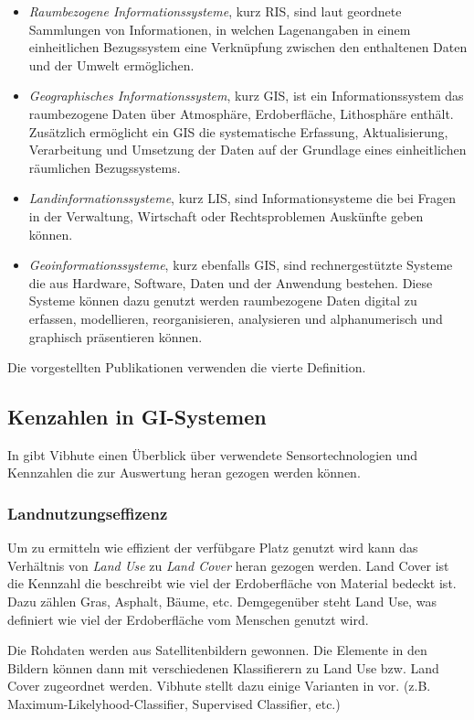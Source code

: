 \begin{itemize}
	\item \textit{Raumbezogene Informationssysteme}, kurz RIS, sind laut \cite{book:Cariosio2006} geordnete Sammlungen von Informationen, in welchen Lagenangaben in einem einheitlichen Bezugssystem eine Verknüpfung zwischen den enthaltenen Daten und der Umwelt ermöglichen.
	\item \textit{Geographisches Informationssystem}, kurz GIS, ist ein Informationssystem das raumbezogene Daten über Atmosphäre, Erdoberfläche, Lithosphäre enthält. Zusätzlich ermöglicht ein GIS die systematische Erfassung, Aktualisierung, Verarbeitung und Umsetzung der Daten auf der Grundlage eines einheitlichen räumlichen Bezugssystems.
	\item \textit{Landinformationssysteme}, kurz LIS, sind Informationsysteme die bei Fragen in der Verwaltung, Wirtschaft oder Rechtsproblemen Auskünfte geben können. 
	\item \textit{Geoinformationssysteme}, kurz ebenfalls GIS, sind rechnergestützte Systeme die aus Hardware, Software, Daten und der Anwendung bestehen. Diese Systeme können dazu genutzt werden raumbezogene Daten digital zu erfassen, modellieren, reorganisieren, analysieren und alphanumerisch und graphisch präsentieren können.
\end{itemize}

Die vorgestellten Publikationen verwenden die vierte Definition.

\subsection{Kenzahlen in GI-Systemen}
In \cite{jour:Vibhute2013} gibt Vibhute einen Überblick über verwendete Sensortechnologien und Kennzahlen die zur Auswertung heran gezogen werden können.  

\subsubsection{Landnutzungseffizenz}

Um zu ermitteln wie effizient der verfübgare Platz genutzt wird kann das Verhältnis von \textit{Land Use} zu \textit{Land Cover} heran gezogen werden. Land Cover ist die Kennzahl die beschreibt wie viel der Erdoberfläche von Material bedeckt ist. Dazu zählen Gras, Asphalt, Bäume, etc. Demgegenüber steht Land Use, was definiert wie viel der Erdoberfläche vom Menschen genutzt wird.

Die Rohdaten werden aus Satellitenbildern gewonnen. Die Elemente in den Bildern können dann mit verschiedenen Klassifierern zu Land Use bzw. Land Cover zugeordnet werden. Vibhute stellt dazu einige Varianten in \cite{jour:Vibhute2013} vor. (z.B. Maximum-Likelyhood-Classifier, Supervised Classifier, etc.)

